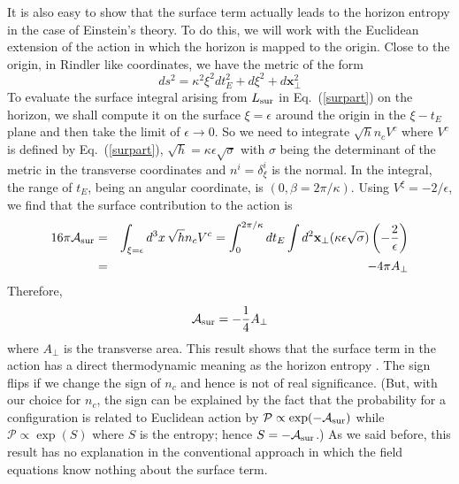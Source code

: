 \documentclass[12pt]{iopart}
\def\eq#1{{Eq.~(\ref{#1})}}
\begin{document}
It is also easy to show that the surface term actually leads to the horizon entropy in the case of Einstein's theory. To do this, we will work with the Euclidean extension of the action in which the horizon is mapped to the origin. Close to the origin, in Rindler like coordinates, we have the metric of the form 
\begin{equation}
ds^2 =  \kappa^2 \xi^2 dt_E^2 + d\xi^2 + d\mathbf{x}_\perp^2
\label{surfrindnew}
\end{equation} 
To evaluate the surface integral arising from $L_{\rm sur}$ in \eq{surpart} on the  horizon, we shall compute it on the surface $\xi = \epsilon$ around the origin in the $\xi-t_E$ plane and then take the limit of $\epsilon \to 0$. 
So we need to integrate $\sqrt{h} n_c V^c$ where $V^c$ is defined by \eq{surpart},
$\sqrt{h}=\kappa \epsilon \sqrt{\sigma} $ with ${\sigma}$ being the determinant of the metric in the 
transverse coordinates and $n^i = \delta^i_\xi$ is the normal. In the integral, the range of $t_E$, being an angular coordinate, is 
 $(0,\beta =2\pi/\kappa)$. Using  $V^\xi= -2/\epsilon$,
 we find that the surface contribution to the action is 
 \begin{eqnarray}
  16\pi \mathcal{A}_{\rm sur} &=& \int_{\xi=\epsilon} d^3x\, \sqrt{h} n_c V^c = \int_0^{2\pi/\kappa} dt_E \int d^2 \mathbf{x}_\perp ( \kappa\epsilon \sqrt{\sigma}) \left(-\frac{2}{\epsilon}\right)\nonumber\\
   &=&-4\pi A_\perp
 \end{eqnarray} 
 Therefore,
 \begin{equation}
\mathcal{A}_{\rm sur} = - \frac{1}{4} A_\perp 
\label{onequarter}
\end{equation} 
where $A_\perp $ is the transverse area.
This result shows that the surface term in the action has a direct thermodynamic meaning
as the horizon entropy \cite{TPgrav06}.
The sign flips if we change the sign of $n_c$ and hence is not of real significance.
(But, with our choice for $n_c$, the sign   can be explained by the fact that the probability for a configuration
is related to Euclidean action by $\mathcal{P} \propto \exp(-\mathcal{A}_{\rm sur})$
while $\mathcal{P} \propto \exp(S)$ where $S$ is the entropy; hence
$S= - \mathcal{A}_{\rm sur}$.)
As we said before, this result has no explanation  in the conventional approach in
which the field equations know nothing about the surface term.
\end{document}

